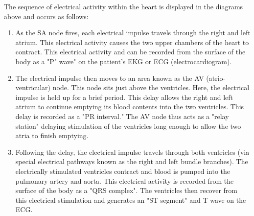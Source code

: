 The sequence of electrical activity within the heart is displayed in the diagrams above and occurs as follows:
\begin{enumerate}
	\item As the SA node fires, each electrical impulse travels through the right and left atrium. This electrical activity causes the two upper chambers of the heart to contract. This electrical activity and can be recorded from the surface of the body as a "P" wave" on the patient's EKG or ECG (electrocardiogram).
	\item The electrical impulse then moves to an area known as the AV (atrio-ventricular) node. This node sits just above the ventricles. Here, the electrical impulse is held up for a brief period. This delay allows the right and left atrium to continue emptying its blood contents into the two ventricles. This delay is recorded as a "PR interval." The AV node thus acts as a "relay station" delaying stimulation of the ventricles long enough to allow the two atria to finish emptying.
	\item Following the delay, the electrical impulse travels through both ventricles (via special electrical pathways known as the right and left bundle branches). The electrically stimulated ventricles contract and blood is pumped into the pulmonary artery and aorta. This electrical activity is recorded from the surface of the body as a "QRS complex". The ventricles then recover from this electrical stimulation and generates an "ST segment" and T wave on the ECG.
\end{enumerate}


